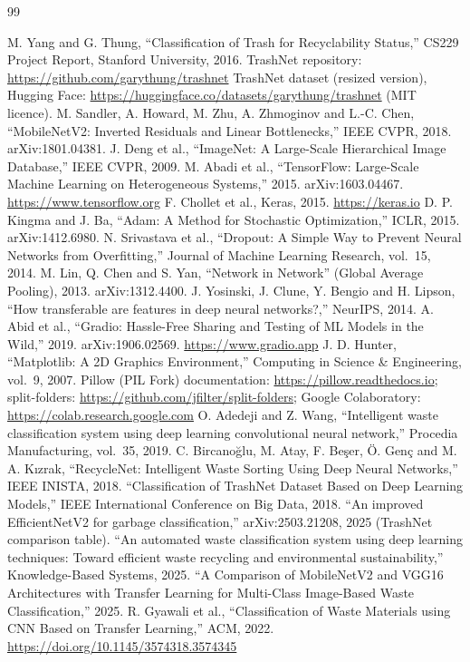 \begin{thebibliography}{99}
\small
{} M. Yang and G. Thung, ``Classification of Trash for Recyclability Status,'' CS229 Project Report, Stanford University, 2016. TrashNet repository: \url{https://github.com/garythung/trashnet}
 TrashNet dataset (resized version), Hugging Face: \url{https://huggingface.co/datasets/garythung/trashnet} (MIT licence).
 M. Sandler, A. Howard, M. Zhu, A. Zhmoginov and L.-C. Chen, ``MobileNetV2: Inverted Residuals and Linear Bottlenecks,'' IEEE CVPR, 2018. arXiv:1801.04381.
 J. Deng et al., ``ImageNet: A Large-Scale Hierarchical Image Database,'' IEEE CVPR, 2009.
 M. Abadi et al., ``TensorFlow: Large-Scale Machine Learning on Heterogeneous Systems,'' 2015. arXiv:1603.04467. \url{https://www.tensorflow.org}
 F. Chollet et al., Keras, 2015. \url{https://keras.io}
 D. P. Kingma and J. Ba, ``Adam: A Method for Stochastic Optimization,'' ICLR, 2015. arXiv:1412.6980.
 N. Srivastava et al., ``Dropout: A Simple Way to Prevent Neural Networks from Overfitting,'' Journal of Machine Learning Research, vol.~15, 2014.
 M. Lin, Q. Chen and S. Yan, ``Network in Network'' (Global Average Pooling), 2013. arXiv:1312.4400.
 J. Yosinski, J. Clune, Y. Bengio and H. Lipson, ``How transferable are features in deep neural networks?,'' NeurIPS, 2014.
 A. Abid et al., ``Gradio: Hassle-Free Sharing and Testing of ML Models in the Wild,'' 2019. arXiv:1906.02569. \url{https://www.gradio.app}
 J. D. Hunter, ``Matplotlib: A 2D Graphics Environment,'' Computing in Science \& Engineering, vol.~9, 2007.
 Pillow (PIL Fork) documentation: \url{https://pillow.readthedocs.io}; split-folders: \url{https://github.com/jfilter/split-folders}; Google Colaboratory: \url{https://colab.research.google.com}
 O. Adedeji and Z. Wang, ``Intelligent waste classification system using deep learning convolutional neural network,'' Procedia Manufacturing, vol.~35, 2019.
 C. Bircano\u{g}lu, M. Atay, F. Be\c{s}er, \"O. Gen\c{c} and M. A. K{\i}zrak, ``RecycleNet: Intelligent Waste Sorting Using Deep Neural Networks,'' IEEE INISTA, 2018.
 ``Classification of TrashNet Dataset Based on Deep Learning Models,'' IEEE International Conference on Big Data, 2018.
 ``An improved EfficientNetV2 for garbage classification,'' arXiv:2503.21208, 2025 (TrashNet comparison table).
 ``An automated waste classification system using deep learning techniques: Toward efficient waste recycling and environmental sustainability,'' Knowledge-Based Systems, 2025.
 ``A Comparison of MobileNetV2 and VGG16 Architectures with Transfer Learning for Multi-Class Image-Based Waste Classification,'' 2025.
 R. Gyawali et al., ``Classification of Waste Materials using CNN Based on Transfer Learning,'' ACM, 2022. \url{https://doi.org/10.1145/3574318.3574345}
\end{thebibliography}
